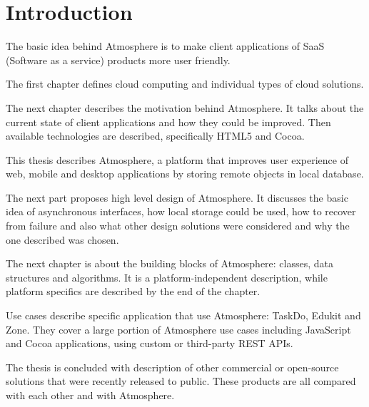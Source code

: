 \setcounter{page}{1}
\setcounter{equation}{0}
\setcounter{figure}{0}
\setcounter{table}{0}

\section*{Introduction}

The basic idea behind Atmosphere is to make client applications of SaaS (Software as a service) products more user friendly.

The first chapter defines cloud computing and individual types of cloud solutions.

The next chapter describes the motivation behind Atmosphere. It talks about the current state of client applications and how they could be improved. Then available technologies are described, specifically HTML5 and Cocoa.

This thesis describes Atmosphere, a platform that improves user experience of web, mobile and desktop applications by storing remote objects in local database.

The next part proposes high level design of Atmosphere. It discusses the basic idea of asynchronous interfaces, how local storage could be used, how to recover from failure and also what other design solutions were considered and why the one described was chosen.

The next chapter is about the building blocks of Atmosphere: classes, data structures and algorithms. It is a platform-independent description, while platform specifics are described by the end of the chapter.

Use cases describe specific application that use Atmosphere: TaskDo, Edukit and Zone. They cover a large portion of Atmosphere use cases including JavaScript and Cocoa applications, using custom or third-party REST APIs.

The thesis is concluded with description of other commercial or open-source solutions that were recently released to public. These products are all compared with each other and with Atmosphere. 